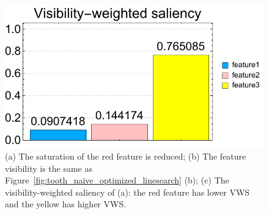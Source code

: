 \begin{figure}
\begin{minipage}{.24\textwidth}
		\subcaption{}
	\end{minipage}~
	\begin{minipage}{.24\textwidth}
		\includegraphics[width=1\linewidth]{figures/tooth_naive_optimized_linesearch_red_low_saturation_visibility_saliency_weighted_chart}
		\subcaption{}
	\end{minipage}
	\caption[The saturation of the red feature is reduced.]{(a) The saturation of the red feature is reduced; (b) The feature visibility is the same as Figure~\ref{fig:tooth_naive_optimized_linesearch} (b); (c) The visibility-weighted saliency of (a): the red feature has lower VWS and the yellow has higher VWS.}
	\label{fig:tooth_naive_optimized_linesearch_low_saturation}
\end{figure}
%
